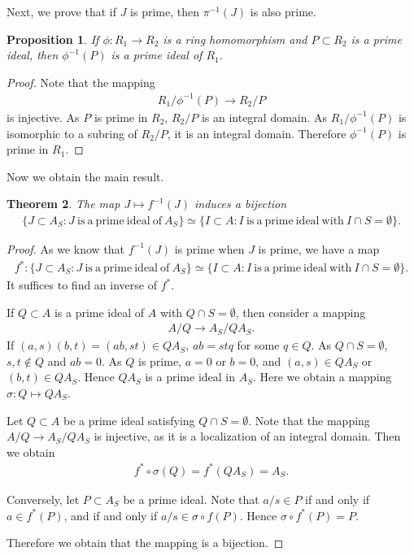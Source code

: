 \documentclass[12pt]{report}
\theoremstyle{plain}
\newtheorem{theorem}{Theorem}[section]
\newtheorem{proposition}[theorem]{Proposition}
\theoremstyle{remark}
\theoremstyle{definition}
\begin{document}
Next, we prove that if $J$ is prime, then $\pi^{-1}(J)$ is also prime.

\begin{proposition}
    If $\phi:R_1\rightarrow R_2$ is a ring homomorphism and $P\subset R_2$ is a prime ideal, then $\phi^{-1}(P)$ is a prime ideal of $R_1$.
\end{proposition}
\begin{proof}
    Note that the mapping
    \begin{align*}
        R_1/\phi^{-1}(P)\rightarrow R_2/P
    \end{align*}
    is injective. As $P$ is prime in $R_2$, $R_2/P$ is an integral domain. As $R_1/\phi^{-1}(P)$ is isomorphic to a subring of $R_2/P$, it is an integral domain. Therefore $\phi^{-1}(P)$ is prime in $R_1$.
\end{proof}

Now we obtain the main result.

\clearpage
\begin{theorem}
    The map $J\mapsto f^{-1}(J)$ induces a bijection
    \begin{align*}
        \{J\subset A_S:J\mathrm{~is~a~prime~ideal~of~}A_S\}\simeq \{I\subset A:I\mathrm{~is~a~prime~ideal~with~}I\cap S=\emptyset\}.
    \end{align*}
\end{theorem}
\begin{proof}
    As we know that $f^{-1}(J)$ is prime when $J$ is prime, we have a map
    \begin{align*}
        f^*:\{J\subset A_S:J\mathrm{~is~a~prime~ideal~of~}A_S\}\simeq \{I\subset A:I\mathrm{~is~a~prime~ideal~with~}I\cap S=\emptyset\}.
    \end{align*}
    It suffices to find an inverse of $f^*$.

    If $Q\subset A$ is a prime ideal of $A$ with $Q\cap S=\emptyset$, then consider a mapping
    \begin{align*}
        A/Q\rightarrow A_S/QA_S.
    \end{align*}
    If $(a,s)(b,t)=(ab,st)\in QA_S$, $ab=stq$ for some $q\in Q$. As $Q\cap S=\emptyset$, $s,t\notin Q$ and $ab=0$. As $Q$ is prime, $a=0$ or $b=0$, and $(a,s)\in QA_S$ or $(b,t)\in QA_S$. Hence $QA_S$ is a prime ideal in $A_S$. Here we obtain a mapping $\sigma:Q\mapsto QA_S$.
    
    Let $Q\subset A$ be a prime ideal satisfying $Q\cap S=\emptyset$. Note that the mapping $A/Q\rightarrow A_S/QA_S$ is injective, as it is a localization of an integral domain. Then we obtain
    \begin{align*}
        f^*\circ \sigma(Q) = f^*(QA_S)=A_S.
    \end{align*}

    Conversely, let $P\subset A_S$ be a prime ideal. Note that $a/s\in P$ if and only if $a\in f^*(P)$, and if and only if $a/s\in \sigma\circ f(P)$. Hence $\sigma\circ f^*(P)=P$.

    Therefore we obtain that the mapping is a bijection.
\end{proof}
\end{document}
